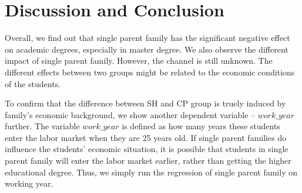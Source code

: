 \documentclass[]{AEA}
\begin{document}
\section{Discussion and Conclusion}

    Overall, we find out that single parent family has the significant negative effect on academic degrees, especially in master degree. We also observe the different impact of single parent family. However, the channel is still unknown. The different effects between two groups might be related to the economic conditions of the students. 

    To confirm that the difference between SH and CP group is truely induced by family's economic background, we show another dependent variable -- $work\_year$ further. The variable $work\_year$ is defined as how many years these students enter the labor market when they are 25 years old. If single parent families do influence the students' economic situation, it is possible that students in single parent family will enter the labor market earlier, rather than getting the higher educational degree. Thus, we simply run the regression of single parent family on working year.
\end{document}
